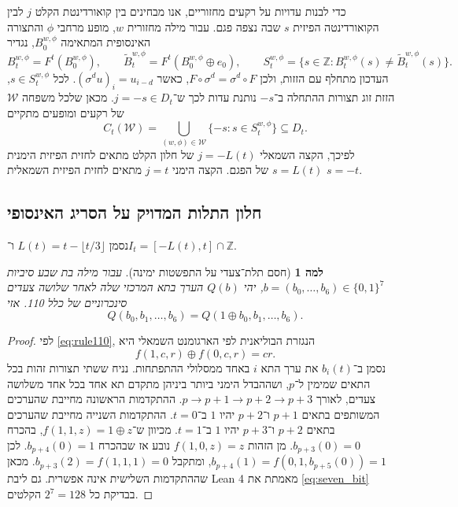 \documentclass[11pt,a4paper]{article}
\DeclareRobustCommand{\textenglish}[1]{\foreignlanguage{english}{#1}}
\newtheorem{lemma}[theorem]{למה}
\theoremstyle{definition}
\begin{document}
כדי לבנות עדויות על רקעים מחזוריים, אנו מבחינים בין קואורדינטת הקלט $j$ לבין הקואורדינטה הפיזית $s$ שבה נצפה פגם. עבור מילה מחזורית $w$, מופע מרחבי $\phi$ והתצורה האינסופית המתאימה $B_0^{w,\phi}$, נגדיר
\begin{equation}\label{eq:diff_support}
B_t^{w,\phi} = F^t(B_0^{w,\phi}), \qquad
\widetilde B_t^{w,\phi} = F^t(B_0^{w,\phi} \oplus e_0), \qquad
S_t^{w,\phi} = \{ s \in \mathbb{Z} : B_t^{w,\phi}(s) \ne \widetilde B_t^{w,\phi}(s) \}.
\end{equation}
העדכון מתחלף עם הזזות, ולכן $F \circ \sigma^d = \sigma^d \circ F$, כאשר $(\sigma^d u)_i = u_{i-d}$. לכל $s \in S_t^{w,\phi}$, הזזת זוג תצורות ההתחלה ב־$-s$ נותנת עדות לכך ש־$j = -s \in D_t$. מכאן שלכל משפחה $\mathcal{W}$ של רקעים ומופעים מתקיים
\begin{equation}\label{eq:coverage_bridge}
C_t(\mathcal{W}) = \bigcup_{(w,\phi) \in \mathcal{W}} \{ -s : s \in S_t^{w,\phi} \} \subseteq D_t.
\end{equation}
לפיכך, הקצה השמאלי $j = -L(t)$ של חלון הקלט מתאים לחזית הפיזית הימנית $s = L(t)$ של הפגם. הקצה הימני $j = t$ מתאים לחזית הפיזית השמאלית $s = -t$.

\subsection{חלון התלות המדויק על הסריג האינסופי}

נסמן $L(t) = t - \lfloor t/3 \rfloor$ ו־$I_t = [-L(t), t] \cap \mathbb{Z}$.

\begin{lemma}[חסם תלת־צעדי על התפשטות ימינה]\label{lem:three_step}
עבור מילה בת שבע סיביות $b = (b_0, \dots, b_6) \in \{0, 1\}^7$, יהי $Q(b)$ הערך בתא המרכזי שלה לאחר שלושה צעדים סינכרוניים של כלל 110. אזי
\begin{equation}\label{eq:seven_bit}
Q(b_0, b_1, \dots, b_6) = Q(1 \oplus b_0, b_1, \dots, b_6).
\end{equation}
\end{lemma}

\begin{proof}
לפי \eqref{eq:rule110}, הנגזרת הבוליאנית לפי הארגומנט השמאלי היא
\begin{equation}\label{eq:bool_deriv}
f(1, c, r) \oplus f(0, c, r) = cr.
\end{equation}
נסמן ב־$b_i(t)$ את ערך התא $i$ באחד ממסלולי ההתפתחות. נניח ששתי תצורות זהות בכל התאים שמימין ל־$p$, ושההבדל הימני ביותר ביניהן מתקדם תא אחד בכל אחד משלושה צעדים, לאורך $p \to p+1 \to p+2 \to p+3$. ההתקדמות הראשונה מחייבת שהערכים המשותפים בתאים $p+1$ ו־$p+2$ יהיו $1$ ב־$t=0$. ההתקדמות השנייה מחייבת שהערכים בתאים $p+2$ ו־$p+3$ יהיו $1$ ב־$t=1$. מכיוון ש־$f(1, 1, z) = 1 \oplus z$, בהכרח $b_{p+3}(0) = 0$. מן הזהות $f(1, 0, z) = z$ נובע אז שבהכרח $b_{p+4}(0) = 1$. לכן $b_{p+4}(1) = f(0, 1, b_{p+5}(0)) = 1$, ומתקבל $b_{p+3}(2) = f(1, 1, 1) = 0$. מכאן שההתקדמות השלישית אינה אפשרית. גם ליבת \textenglish{Lean 4} מאמתת את \eqref{eq:seven_bit} בבדיקת כל $2^7 = 128$ הקלטים.
\end{proof}
\end{document}
